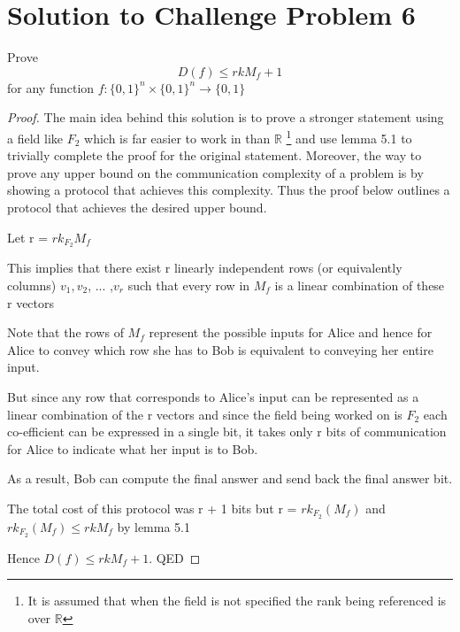 \documentclass[usletter]{article}
\begin{document}
\section{Solution to Challenge Problem 6}

\begin{problem}
Prove $$ D(f) \leq rk M_f + 1 $$ for any function $f: {\{0, 1\}}^n \times {\{0, 1\}}^n \rightarrow \{0, 1\}$
\end {problem}

\begin{proof}
The main idea behind this solution is to prove a stronger statement using a field like $F_2$ which is far easier to work in than $\mathbb{R}$ \footnote {It is assumed that when the field is not specified the rank being referenced is over $\mathbb{R}$} and use lemma 5.1 to trivially complete the proof for the original statement. Moreover, the way to prove any upper bound on the communication complexity of a problem is by showing a protocol that achieves this complexity. Thus the proof below outlines a protocol that achieves the desired upper bound. \newline

\noindent Let r = $rk_{F_2} M_f$ \newline

\noindent This implies that there exist r linearly independent rows (or equivalently columns)  $v_1, v_2$, ... ,$v_r$ such that every row in $M_f$ is a linear combination of these r vectors \newline

\noindent Note that the rows of $M_f$ represent the possible inputs for Alice and hence for Alice to convey which row she has to Bob is equivalent to conveying her entire input. \newline

\noindent But since any row that corresponds to Alice's input can be represented as a linear combination of the r vectors and since the field being worked on is $F_2$ each co-efficient can be expressed in a single bit, it takes only r bits of communication for Alice to indicate what her input is to Bob. \newline

\noindent As a result, Bob can compute the final answer and send back the final answer bit. \newline

\noindent The total cost of this protocol was r + 1 bits but r = $rk_{F_2}(M_f)$ and $rk_{F_2}(M_f) \leq rk{M_f}$  by lemma 5.1 \newline

\noindent Hence $D(f) \leq rk M_f + 1$. QED 
\end{proof}



\end{document}
